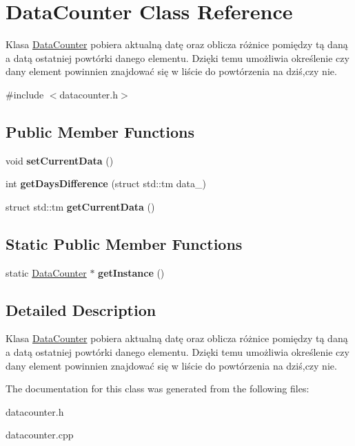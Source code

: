 \hypertarget{class_data_counter}{}\section{Data\+Counter Class Reference}
\label{class_data_counter}


Klasa \mbox{\hyperlink{class_data_counter}{Data\+Counter}} pobiera aktualną datę oraz oblicza różnice pomiędzy tą daną a datą ostatniej powtórki danego elementu. Dzięki temu umożliwia określenie czy dany element powinnien znajdować się w liście do powtórzenia na dziś,czy nie.  




{\ttfamily \#include $<$datacounter.\+h$>$}

\subsection*{Public Member Functions}
\begin{DoxyCompactItemize}
\item 
\mbox{\label{class_data_counter_ad3b3cb7addf5e0dbb8d5a76220884717}} 
void {\bfseries set\+Current\+Data} ()
\item 
\mbox{\label{class_data_counter_adf801ff96f2fa290fa0d65ccfabd5d84}} 
int {\bfseries get\+Days\+Difference} (struct std\+::tm data\+\_\+)
\item 
\mbox{\label{class_data_counter_a698e215d52c6b1634397273877a14a24}} 
struct std\+::tm {\bfseries get\+Current\+Data} ()
\end{DoxyCompactItemize}
\subsection*{Static Public Member Functions}
\begin{DoxyCompactItemize}
\item 
\mbox{\label{class_data_counter_a92a2b021515881d1ed48249a88f4e1cf}} 
static \mbox{\hyperlink{class_data_counter}{Data\+Counter}} $\ast$ {\bfseries get\+Instance} ()
\end{DoxyCompactItemize}


\subsection{Detailed Description}
Klasa \mbox{\hyperlink{class_data_counter}{Data\+Counter}} pobiera aktualną datę oraz oblicza różnice pomiędzy tą daną a datą ostatniej powtórki danego elementu. Dzięki temu umożliwia określenie czy dany element powinnien znajdować się w liście do powtórzenia na dziś,czy nie. 

The documentation for this class was generated from the following files\+:\begin{DoxyCompactItemize}
\item 
datacounter.\+h\item 
datacounter.\+cpp\end{DoxyCompactItemize}
